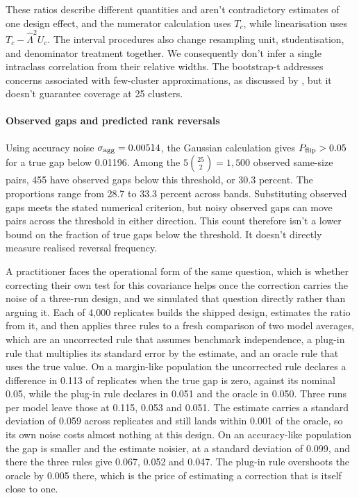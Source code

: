 These ratios describe different quantities and aren't contradictory estimates of one design effect, and the numerator calculation uses $T_c$, while linearisation uses $T_c-\widehat\Lambda^2U_c$. The interval procedures also change resampling unit, studentisation, and denominator treatment together. We consequently don't infer a single intraclass correlation from their relative widths. The bootstrap-t addresses concerns associated with few-cluster approximations, as discussed by \citet{bell2002}, but it doesn't guarantee coverage at 25 clusters.

\paragraph{Observed gaps and predicted rank reversals}
Using accuracy noise $\sigma_{\rm agg}=0.00514$, the Gaussian calculation gives $P_{\rm flip}>0.05$ for a true gap below 0.01196. Among the $5\binom{25}{2}=1{,}500$ observed same-size pairs, 455 have observed gaps below this threshold, or 30.3 percent. The proportions range from 28.7 to 33.3 percent across bands. Substituting observed gaps meets the stated numerical criterion, but noisy observed gaps can move pairs across the threshold in either direction. This count therefore isn't a lower bound on the fraction of true gaps below the threshold. It doesn't directly measure realised reversal frequency.

A practitioner faces the operational form of the same question, which is whether correcting their own test for this covariance helps once the correction carries the noise of a three-run design, and we simulated that question directly rather than arguing it. Each of 4,000 replicates builds the shipped design, estimates the ratio from it, and then applies three rules to a fresh comparison of two model averages, which are an uncorrected rule that assumes benchmark independence, a plug-in rule that multiplies its standard error by the estimate, and an oracle rule that uses the true value. On a margin-like population the uncorrected rule declares a difference in 0.113 of replicates when the true gap is zero, against its nominal 0.05, while the plug-in rule declares in 0.051 and the oracle in 0.050. Three runs per model leave those at 0.115, 0.053 and 0.051. The estimate carries a standard deviation of 0.059 across replicates and still lands within 0.001 of the oracle, so its own noise costs almost nothing at this design. On an accuracy-like population the gap is smaller and the estimate noisier, at a standard deviation of 0.099, and there the three rules give 0.067, 0.052 and 0.047. The plug-in rule overshoots the oracle by 0.005 there, which is the price of estimating a correction that is itself close to one.

